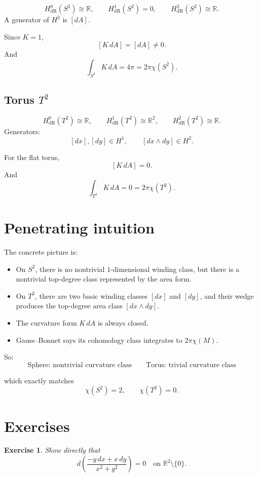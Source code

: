 \documentclass[11pt]{article}
\newtheorem{exercise}{Exercise}
\begin{document}
	\[
	H^0_{\mathrm{dR}}(S^2)\cong\mathbb{R},\qquad
	H^1_{\mathrm{dR}}(S^2)=0,\qquad
	H^2_{\mathrm{dR}}(S^2)\cong\mathbb{R}.
	\]
	A generator of \(H^2\) is \([dA]\).
	
	Since \(K=1\),
	\[
	[K\,dA]=[dA]\neq 0.
	\]
	And
	\[
	\int_{S^2}K\,dA=4\pi=2\pi\chi(S^2).
	\]
	
	\subsection*{Torus \(T^2\)}
	
	\[
	H^0_{\mathrm{dR}}(T^2)\cong\mathbb{R},\qquad
	H^1_{\mathrm{dR}}(T^2)\cong\mathbb{R}^2,\qquad
	H^2_{\mathrm{dR}}(T^2)\cong\mathbb{R}.
	\]
	Generators:
	\[
	[dx],[dy]\in H^1,\qquad [dx\wedge dy]\in H^2.
	\]
	
	For the flat torus,
	\[
	[K\,dA]=0.
	\]
	And
	\[
	\int_{T^2}K\,dA=0=2\pi\chi(T^2).
	\]
	
	\section{Penetrating intuition}
	
	The concrete picture is:
	
	\begin{itemize}[leftmargin=2em]
		\item On \(S^2\), there is no nontrivial \(1\)-dimensional winding class, but there is a nontrivial top-degree class represented by the area form.
		\item On \(T^2\), there are two basic winding classes \([dx]\) and \([dy]\), and their wedge produces the top-degree area class \([dx\wedge dy]\).
		\item The curvature form \(K\,dA\) is always closed.
		\item Gauss--Bonnet says its cohomology class integrates to \(2\pi\chi(M)\).
	\end{itemize}
	
	So:
	\[
	\boxed{
		\text{Sphere: nontrivial curvature class}
		\qquad
		\text{Torus: trivial curvature class}
	}
	\]
	
	which exactly matches
	\[
	\chi(S^2)=2,\qquad \chi(T^2)=0.
	\]
	
	\section{Exercises}
	
	\begin{exercise}
		Show directly that
		\[
		d\!\left(\frac{-y\,dx+x\,dy}{x^2+y^2}\right)=0
		\quad\text{on }\mathbb{R}^2\setminus\{0\}.
		\]
	\end{exercise}
	
\end{document}
